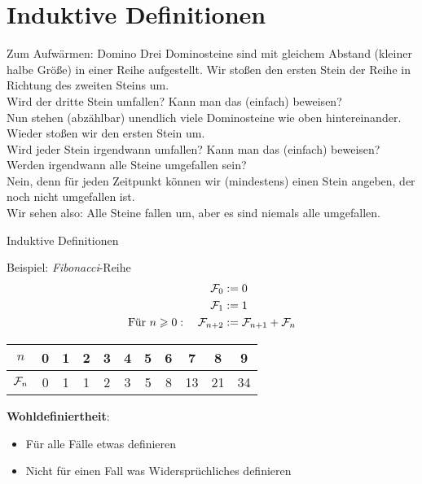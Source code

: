 \section{Induktive Definitionen}

\begin{frame}{Zum Aufwärmen: Domino}
	Drei Dominosteine sind mit gleichem Abstand (kleiner halbe Größe) in einer Reihe aufgestellt. Wir stoßen den ersten Stein der Reihe in Richtung des zweiten Steins um. \\
	Wird der dritte Stein umfallen? Kann man das (einfach) beweisen? \\[1em]
	\pause
	Nun stehen (abzählbar) unendlich viele Dominosteine wie oben hintereinander. Wieder stoßen wir den ersten Stein um. \\
	Wird jeder Stein irgendwann umfallen? Kann man das (einfach) beweisen? \\[1em]
	\pause
	Werden irgendwann alle Steine umgefallen sein? \\
	\pause Nein, denn für jeden Zeitpunkt können wir (mindestens) einen Stein angeben, der noch nicht umgefallen ist.\\
	Wir sehen also: Alle Steine fallen um, aber es sind niemals alle umgefallen.
\end{frame}

\newcommand{\Fib}{\mathcal{F}\hspace{-1pt}}

\begin{frame}{Induktive Definitionen}
	\begin{exampleblock}{Beispiel: \emph{Fibonacci}-Reihe}
		\begin{align*}
		\Fib_0 &:= 0 \\
		\Fib_1 &:= 1 \\
		\text{Für } n \geq 0: \quad \Fib_{n+2} &:= \Fib_{n+1} + \Fib_n 		
		\end{align*}
		\pause
		\begin{table}
			\centering
			\begin{tabular}{|c|c|c|c|c|c|c|c|c|c|c|}
				\hline
				$n$ & 0 & 1 & 2 & 3 & 4 & 5 & 6 & 7 & 8 & 9 \\ \hline
				$\Fib_n$ & 0 & 1 & 1 & 2 & 3 & 5 & 8 & 13 & 21 & 34 \\ \hline
			\end{tabular}
		\end{table}
		
		\pause
		\textbf{Wohldefiniertheit}: 
		\begin{itemize}
			\item Für alle Fälle etwas definieren 
			\item Nicht für einen Fall was Widersprüchliches definieren
		\end{itemize}
		
	\end{exampleblock}
	
\end{frame}

